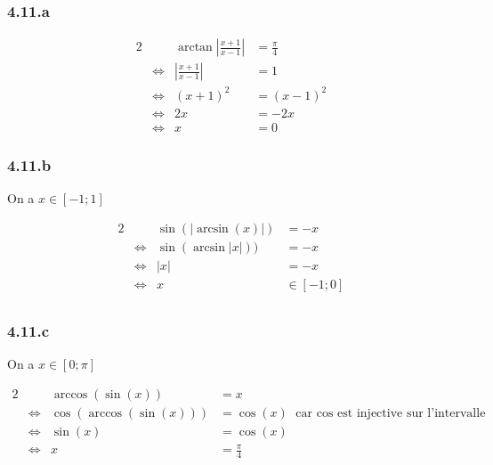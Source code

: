 \documentclass[a4paper,10pt]{report}
\begin{document}
\subsubsection*{4.11.a}

\begin{alignat*}{2}
	&                    & \arctan \left| \frac{x+1}{x-1} \right|  &= \frac{\pi}{4} \\
	&\Longleftrightarrow & \left| \frac{x+1}{x-1} \right|          &= 1 \\
	&\Longleftrightarrow &                                 (x+1)^2 &= (x-1)^2 \\
	&\Longleftrightarrow &                                      2x &= -2x \\
	&\Longleftrightarrow &                                       x &= 0
\end{alignat*}

\subsubsection*{4.11.b}

On a $x \in [-1 ; 1]$

\begin{alignat*}{2}
	&                    & \sin(|\arcsin (x)|) &= -x \\
	&\Longleftrightarrow & \sin(\arcsin |x|))  &= -x \\
	&\Longleftrightarrow &                |x|  &= -x \\
	&\Longleftrightarrow &                   x & \in [-1 ; 0]  \\
\end{alignat*}

\subsubsection*{4.11.c}

On a $x \in [0 ; \pi]$

\begin{alignat*}{2}
	&                    & \arccos(\sin(x))       &= x \\
	&\Longleftrightarrow & \cos(\arccos(\sin(x))) &= \cos(x) \text{ car $\cos$ est injective sur l'intervalle} \\
	&\Longleftrightarrow &                \sin(x) &= \cos(x) \\
	&\Longleftrightarrow &                      x &= \frac{\pi}{4} \\
\end{alignat*}	
\end{document}

